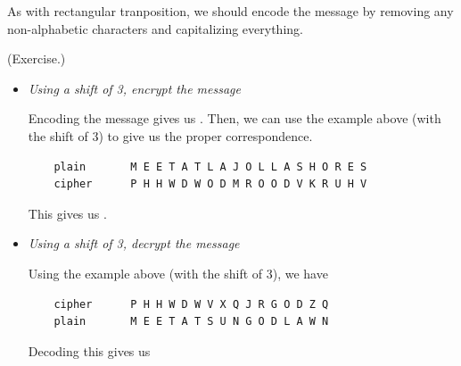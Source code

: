 \documentclass[letterpaper]{article}
\begin{document}
As with rectangular tranposition, we should encode the message by removing any non-alphabetic characters and capitalizing everything. 

\begin{mdframed}
    (Exercise.) 
    \begin{itemize}
        \item \emph{Using a shift of 3, encrypt the message }
        \begin{mdframed}
            Encoding the message gives us . Then, we can use the example above (with the shift of 3) to give us the proper correspondence.
            \begin{verbatim}
    plain       M E E T A T L A J O L L A S H O R E S
    cipher      P H H W D W O D M R O O D V K R U H V\end{verbatim}
            This gives us .
        \end{mdframed}
        \item \emph{Using a shift of 3, decrypt the message }
        \begin{mdframed}
            Using the example above (with the shift of 3), we have
            \begin{verbatim}
    cipher      P H H W D W V X Q J R G O D Z Q
    plain       M E E T A T S U N G O D L A W N\end{verbatim}
            Decoding this gives us 
        \end{mdframed}
    \end{itemize}
\end{mdframed}
\end{document}

